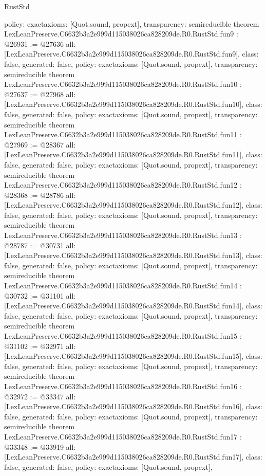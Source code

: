 \begin{lexlean}{RustStd}
\begin{coremodule}
{  policy: exact{axioms: [Quot.sound, propext]},
  transparency: semireducible
}
theorem LexLeanPreserve.C6632b3a2e999d115038026ca828209de.R0.RustStd.fun9 : @26931 := @27636 {
  all: [LexLeanPreserve.C6632b3a2e999d115038026ca828209de.R0.RustStd.fun9],
  class: false,
  generated: false,
  policy: exact{axioms: [Quot.sound, propext]},
  transparency: semireducible
}
theorem LexLeanPreserve.C6632b3a2e999d115038026ca828209de.R0.RustStd.fun10 : @27637 := @27968 {
  all: [LexLeanPreserve.C6632b3a2e999d115038026ca828209de.R0.RustStd.fun10],
  class: false,
  generated: false,
  policy: exact{axioms: [Quot.sound, propext]},
  transparency: semireducible
}
theorem LexLeanPreserve.C6632b3a2e999d115038026ca828209de.R0.RustStd.fun11 : @27969 := @28367 {
  all: [LexLeanPreserve.C6632b3a2e999d115038026ca828209de.R0.RustStd.fun11],
  class: false,
  generated: false,
  policy: exact{axioms: [Quot.sound, propext]},
  transparency: semireducible
}
theorem LexLeanPreserve.C6632b3a2e999d115038026ca828209de.R0.RustStd.fun12 : @28368 := @28786 {
  all: [LexLeanPreserve.C6632b3a2e999d115038026ca828209de.R0.RustStd.fun12],
  class: false,
  generated: false,
  policy: exact{axioms: [Quot.sound, propext]},
  transparency: semireducible
}
theorem LexLeanPreserve.C6632b3a2e999d115038026ca828209de.R0.RustStd.fun13 : @28787 := @30731 {
  all: [LexLeanPreserve.C6632b3a2e999d115038026ca828209de.R0.RustStd.fun13],
  class: false,
  generated: false,
  policy: exact{axioms: [Quot.sound, propext]},
  transparency: semireducible
}
theorem LexLeanPreserve.C6632b3a2e999d115038026ca828209de.R0.RustStd.fun14 : @30732 := @31101 {
  all: [LexLeanPreserve.C6632b3a2e999d115038026ca828209de.R0.RustStd.fun14],
  class: false,
  generated: false,
  policy: exact{axioms: [Quot.sound, propext]},
  transparency: semireducible
}
theorem LexLeanPreserve.C6632b3a2e999d115038026ca828209de.R0.RustStd.fun15 : @31102 := @32971 {
  all: [LexLeanPreserve.C6632b3a2e999d115038026ca828209de.R0.RustStd.fun15],
  class: false,
  generated: false,
  policy: exact{axioms: [Quot.sound, propext]},
  transparency: semireducible
}
theorem LexLeanPreserve.C6632b3a2e999d115038026ca828209de.R0.RustStd.fun16 : @32972 := @33347 {
  all: [LexLeanPreserve.C6632b3a2e999d115038026ca828209de.R0.RustStd.fun16],
  class: false,
  generated: false,
  policy: exact{axioms: [Quot.sound, propext]},
  transparency: semireducible
}
theorem LexLeanPreserve.C6632b3a2e999d115038026ca828209de.R0.RustStd.fun17 : @33348 := @33919 {
  all: [LexLeanPreserve.C6632b3a2e999d115038026ca828209de.R0.RustStd.fun17],
  class: false,
  generated: false,
  policy: exact{axioms: [Quot.sound, propext]},
}
\end{coremodule}
\end{lexlean}
